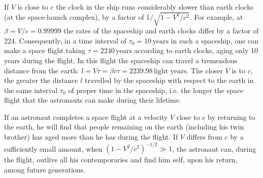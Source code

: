 If $V$ is close to $c$ the clock in the ship runs considerably slower than earth clocks (at the space-launch complex), by a factor of $1/\sqrt{1 - V^{2}/c^{2}}$. For example, at $\beta = V/c = 0.99999$ the rates of the spaceship and earth clocks differ by a factor of 224. Consequently, in a time interval of $\tau_{0}= 10 \,\textrm{years}$ in such a spaceship, one can make a space flight taking $\tau = 2240\,\textrm{years}$ according to earth clocks, aging only 10 years during the flight. In this flight the spaceship can travel a tremendous distance from the earth: $l = V\tau = \beta c \tau = 2239.98 \,\textrm{light years}$. The closer $V$ is to $c$, the greater the distance $l$ travelled by the spaceship with respect to the earth in the same interval $\tau_{0}$
of proper time in the spaceship, i.e. the longer the space flight that the astronauts can make during their lifetime.

If an astronaut completes a space flight at a velocity $V$ close to $c$ by returning to the earth, he will find that people remaining on the earth (including his twin brother) has aged more than he has during the flight. If $V$ differs from $c$ by a sufficiently small amount, when $(1 - V^{2}/c^{2})^{-1/2} \gg 1$, the astronaut can, during the flight, outlive all his contemporaries and find him­ self, upon his return, among future generations.

